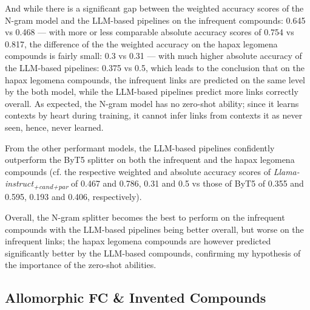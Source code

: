 \documentclass[11pt]{article}
\begin{document}
And while there is a significant gap between the weighted accuracy scores of the N-gram model and the LLM-based pipelines on the infrequent compounds: 0.645 vs 0.468 --- with more or less comparable absolute accuracy scores of 0.754 vs 0.817, the difference of the the weighted accuracy on the hapax legomena compounds is fairly small: 0.3 vs 0.31 --- with much higher absolute accuracy of the LLM-based pipelines: 0.375 vs 0.5, which leads to the conclusion that on the hapax legomena compounds, the infrequent links are predicted on the same level by the both model, while the LLM-based pipelines predict more links correctly overall. As expected, the N-gram model has no zero-shot ability; since it learns contexts by heart during training, it cannot infer links from contexts it as never seen, hence, never learned.

From the other performant models, the LLM-based pipelines confidently outperform the ByT5 splitter on both the infrequent and the hapax legomena compounds (cf. the respective weighted and absolute accuracy scores of \textit{Llama-instruct\textsubscript{+cand+par}} of 0.467 and 0.786, 0.31 and 0.5 vs those of ByT5 of 0.355 and 0.595, 0.193 and 0.406, respectively).

Overall, the N-gram splitter becomes the best to perform on the infrequent compounds with the LLM-based pipelines being better overall, but worse on the infrequent links; the hapax legomena compounds are however predicted significantly better by the LLM-based compounds, confirming my hypothesis of the importance of the zero-shot abilities.


\subsection{Allomorphic FC \& Invented Compounds}
\end{document}
